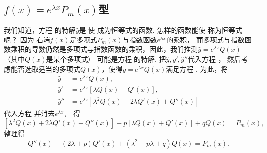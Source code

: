 \subsection{\texorpdfstring{\(f(x) = e^{\lambda x} P_m(x)\)型}{第一类：指数函数与多项式函数的乘积}}
我们知道，方程  的特解\(\hat{y}\)是%
使  成为恒等式的函数.
怎样的函数能使  称为恒等式呢？
因为  右端\(f(x)\)是多项式\(P_m(x)\)与指数函数\(e^{\lambda x}\)的乘积，
而多项式与指数函数乘积的导数仍然是多项式与指数函数的乘积，因此，我们推测\(\hat{y} = e^{\lambda x} Q(x)\)（其中\(Q(x)\)是某个多项式）%
可能是方程  的特解.
把\(\hat{y}, \hat{y}', \hat{y}''\)代入方程 ，
然后考虑能否选取适当的多项式\(Q(x)\)，使得\(\hat{y} = e^{\lambda x} Q(x)\)满足方程 .
为此，将\begin{align*}
	\hat{y} &= e^{\lambda x} Q(x), \\
	\hat{y}' &= e^{\lambda x} [ \lambda Q(x) + Q'(x) ], \\
	\hat{y}'' &= e^{\lambda x} [ \lambda^2 Q(x) + 2\lambda Q'(x) + Q''(x) ]
\end{align*}
代入方程  并消去\(e^{\lambda x}\)，
得\[
	[ \lambda^2 Q(x) + 2\lambda Q'(x) + Q''(x) ]
	+ p [ \lambda Q(x) + Q'(x) ]
	+ q Q(x)
	= P_m(x),
\]
整理得
\begin{equation}\label{equation:微分方程.常系数非齐次线性微分方程.中间步骤1}
Q''(x) + (2\lambda+p) Q'(x) + (\lambda^2+p\lambda+q) Q(x) = P_m(x).
\end{equation}
